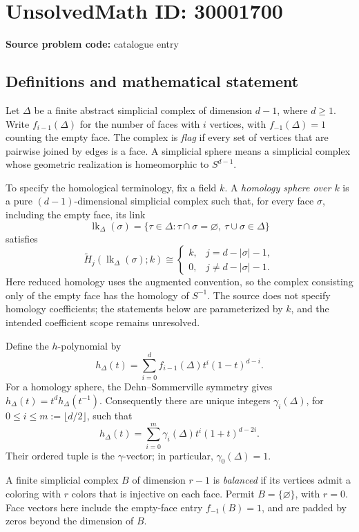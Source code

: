 \documentclass[11pt]{article}
\begin{document}
\section*{UnsolvedMath ID: 30001700}
\textbf{Source problem code:} catalogue entry
\subsection{Definitions and mathematical statement}
Let \(\Delta\) be a finite abstract simplicial complex of dimension \(d-1\), where \(d\geq 1\). Write \(f_{i-1}(\Delta)\) for the number of faces with \(i\) vertices, with \(f_{-1}(\Delta)=1\) counting the empty face. The complex is \emph{flag} if every set of vertices that are pairwise joined by edges is a face. A simplicial sphere means a simplicial complex whose geometric realization is homeomorphic to \(S^{d-1}\).

To specify the homological terminology, fix a field \(k\). A \emph{homology sphere over \(k\)} is a pure \((d-1)\)-dimensional simplicial complex such that, for every face \(\sigma\), including the empty face, its link
\[
\operatorname{lk}_{\Delta}(\sigma)=\{\tau\in\Delta:\tau\cap\sigma=\varnothing,\ \tau\cup\sigma\in\Delta\}
\]
satisfies
\[
\widetilde H_j(\operatorname{lk}_{\Delta}(\sigma);k)\cong
\begin{cases}
k,&j=d-|\sigma|-1,\\
0,&j\ne d-|\sigma|-1.
\end{cases}
\]
Here reduced homology uses the augmented convention, so the complex consisting only of the empty face has the homology of \(S^{-1}\). The source does not specify homology coefficients; the statements below are parameterized by \(k\), and the intended coefficient scope remains unresolved.

Define the \(h\)-polynomial by
\[
h_{\Delta}(t)=\sum_{i=0}^{d}f_{i-1}(\Delta)t^i(1-t)^{d-i}.
\]
For a homology sphere, the Dehn--Sommerville symmetry gives \(h_{\Delta}(t)=t^d h_{\Delta}(t^{-1})\). Consequently there are unique integers \(\gamma_i(\Delta)\), for \(0\leq i\leq m:=\lfloor d/2\rfloor\), such that
\[
h_{\Delta}(t)=\sum_{i=0}^{m}\gamma_i(\Delta)t^i(1+t)^{d-2i}.
\]
Their ordered tuple is the \(\gamma\)-vector; in particular, \(\gamma_0(\Delta)=1\).

A finite simplicial complex \(B\) of dimension \(r-1\) is \emph{balanced} if its vertices admit a coloring with \(r\) colors that is injective on each face. Permit \(B=\{\varnothing\}\), with \(r=0\). Face vectors here include the empty-face entry \(f_{-1}(B)=1\), and are padded by zeros beyond the dimension of \(B\).
\end{document}

